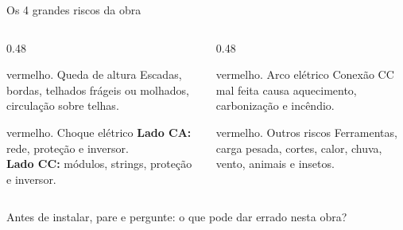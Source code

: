 \documentclass[aspectratio=169,10pt,xcolor=table]{beamer}
\newcommand{\frase}[1]{\vspace{0.1em}\begin{destaque}#1\end{destaque}}
\begin{document}
\begin{frame}{Os 4 grandes riscos da obra}
  \begin{columns}[T]
    \begin{column}{0.48\textwidth}
      \begin{card}[equal height group=r1]{vermelho}{\faUserInjured{}. Queda de altura}
        Escadas, bordas, telhados frágeis ou molhados, circulação sobre telhas.
      \end{card}
      \begin{card}[equal height group=r2]{vermelho}{\faBolt{}. Choque elétrico}
        \textbf{Lado CA:} rede, proteção e inversor.\\
        \textbf{Lado CC:} módulos, strings, proteção e inversor.
      \end{card}
    \end{column}
    \begin{column}{0.48\textwidth}
      \begin{card}[equal height group=r1]{vermelho}{\faFire{}. Arco elétrico}
        Conexão CC mal feita causa aquecimento, carbonização e incêndio.
      \end{card}
      \begin{card}[equal height group=r2]{vermelho}{\faExclamationTriangle{}. Outros riscos}
        Ferramentas, carga pesada, cortes, calor, chuva, vento, animais e insetos.
      \end{card}
    \end{column}
  \end{columns}
  \frase{Antes de instalar, pare e pergunte: o que pode dar errado nesta obra?}
\end{frame}
\end{document}
